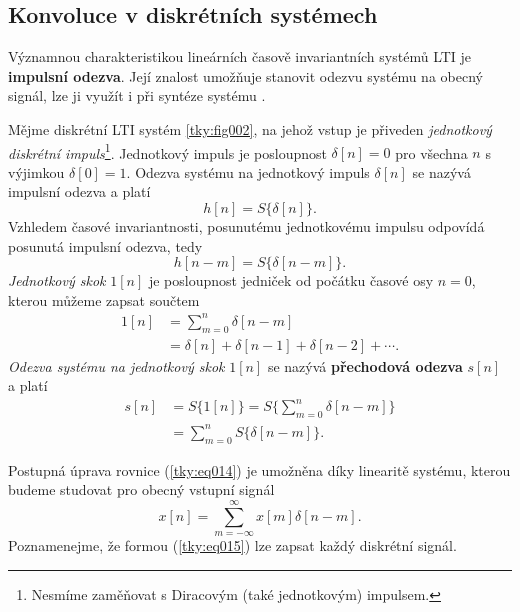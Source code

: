     \subsection{Konvoluce v diskrétních systémech}\label{tky:IchIIsecIssecII}
      Významnou charakteristikou lineárních časově invariantních systémů \textsc{LTI} je
      \textbf{impulsní odezva}. Její znalost umožňuje stanovit odezvu systému na obecný signál, lze 
      ji využít i při syntéze systému \cite{Bicak2007}.

      Mějme diskrétní \textsc{LTI} systém \ref{tky:fig002}, na jehož vstup je přiveden
      \emph{jednotkový diskrétní impuls}\footnote{Nesmíme zaměňovat s Diracovým (také jednotkovým)
      impulsem.}. Jednotkový impuls je posloupnost \(\delta[n]=0\) pro všechna \(n\) s výjimkou
      \(\delta[0]=1\). Odezva systému na jednotkový impuls \(\delta[n]\) se nazývá impulsní odezva a
      platí
      \begin{equation}\label{tky:eq011}
        h[n]= S\{\delta[n]\}.
      \end{equation}
      Vzhledem časové invariantnosti, posunutému jednotkovému impulsu odpovídá posunutá impulsní
      odezva, tedy
      \begin{equation}\label{tky:eq012}
        h[n-m]= S\{\delta[n-m]\}.
      \end{equation}
      \emph{Jednotkový skok} \(1[n]\) je posloupnost jedniček od počátku časové osy \(n=0\),
      kterou můžeme zapsat součtem
      \begin{align}
        1[n]&= \sum_{m=0}^n\delta[n-m]                  \nonumber \\
            &=\delta[n]+\delta[n-1]+\delta[n-2]+\cdots. \label{tky:eq013}
      \end{align}
      \emph{Odezva systému na jednotkový skok} $\mathrm{1}[n]$ se nazývá \textbf{přechodová odezva}
      $s[n]$ a platí
      \begin{align}
        s[n]&= S\{1[n]\}= S\{\sum_{m=0}^n\delta[n-m]\}        \nonumber \\
            &=\sum_{m=0}^nS\{\delta[n-m]\}.                             \label{tky:eq014}
      \end{align}

      Postupná úprava rovnice (\ref{tky:eq014}) je umožněna díky linearitě systému, kterou budeme
      studovat pro obecný vstupní signál
      \begin{equation}\label{tky:eq015}
        x[n]=\sum_{m=-\infty}^\infty x[m]\delta[n-m].
      \end{equation}
      Poznamenejme, že formou (\ref{tky:eq015}) lze zapsat každý diskrétní signál.

